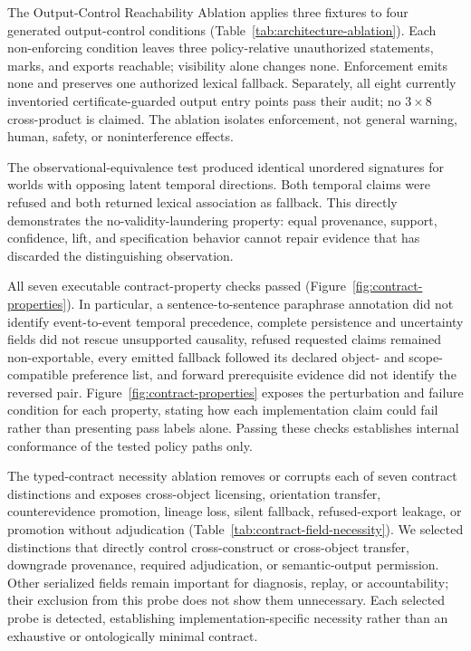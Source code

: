 \documentclass[manuscript,screen,review,anonymous]{acmart}
\begin{document}


The Output-Control Reachability Ablation applies three fixtures to four generated output-control conditions (Table~\ref{tab:architecture-ablation}). Each non-enforcing condition leaves three policy-relative unauthorized statements, marks, and exports reachable; visibility alone changes none. Enforcement emits none and preserves one authorized lexical fallback. Separately, all eight currently inventoried certificate-guarded output entry points pass their audit; no $3\times8$ cross-product is claimed. The ablation isolates enforcement, not general warning, human, safety, or noninterference effects.



The observational-equivalence test produced identical unordered signatures for worlds with opposing latent temporal directions. Both temporal claims were refused and both returned lexical association as fallback. This directly demonstrates the no-validity-laundering property: equal provenance, support, confidence, lift, and specification behavior cannot repair evidence that has discarded the distinguishing observation.

All seven executable contract-property checks passed (Figure~\ref{fig:contract-properties}). In particular, a sentence-to-sentence paraphrase annotation did not identify event-to-event temporal precedence, complete persistence and uncertainty fields did not rescue unsupported causality, refused requested claims remained non-exportable, every emitted fallback followed its declared object- and scope-compatible preference list, and forward prerequisite evidence did not identify the reversed pair. Figure~\ref{fig:contract-properties} exposes the perturbation and failure condition for each property, stating how each implementation claim could fail rather than presenting pass labels alone. Passing these checks establishes internal conformance of the tested policy paths only.

The typed-contract necessity ablation removes or corrupts each of seven contract distinctions and exposes cross-object licensing, orientation transfer, counterevidence promotion, lineage loss, silent fallback, refused-export leakage, or promotion without adjudication (Table~\ref{tab:contract-field-necessity}). We selected distinctions that directly control cross-construct or cross-object transfer, downgrade provenance, required adjudication, or semantic-output permission. Other serialized fields remain important for diagnosis, replay, or accountability; their exclusion from this probe does not show them unnecessary. Each selected probe is detected, establishing implementation-specific necessity rather than an exhaustive or ontologically minimal contract.
\end{document}
